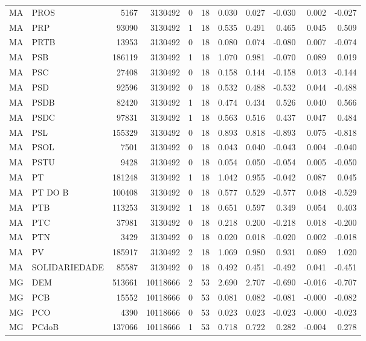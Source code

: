 \begin{landscape}
\begin{longtable}{llrrrrrrrrr}
MA & PROS & 5167 & 3130492 & 0 & 18 & 0.030 & 0.027 & -0.030 & 0.002 & -0.027 \\
MA & PRP & 93090 & 3130492 & 1 & 18 & 0.535 & 0.491 & 0.465 & 0.045 & 0.509 \\
MA & PRTB & 13953 & 3130492 & 0 & 18 & 0.080 & 0.074 & -0.080 & 0.007 & -0.074 \\
MA & PSB & 186119 & 3130492 & 1 & 18 & 1.070 & 0.981 & -0.070 & 0.089 & 0.019 \\
MA & PSC & 27408 & 3130492 & 0 & 18 & 0.158 & 0.144 & -0.158 & 0.013 & -0.144 \\
MA & PSD & 92596 & 3130492 & 0 & 18 & 0.532 & 0.488 & -0.532 & 0.044 & -0.488 \\
MA & PSDB & 82420 & 3130492 & 1 & 18 & 0.474 & 0.434 & 0.526 & 0.040 & 0.566 \\
MA & PSDC & 97831 & 3130492 & 1 & 18 & 0.563 & 0.516 & 0.437 & 0.047 & 0.484 \\
MA & PSL & 155329 & 3130492 & 0 & 18 & 0.893 & 0.818 & -0.893 & 0.075 & -0.818 \\
MA & PSOL & 7501 & 3130492 & 0 & 18 & 0.043 & 0.040 & -0.043 & 0.004 & -0.040 \\
MA & PSTU & 9428 & 3130492 & 0 & 18 & 0.054 & 0.050 & -0.054 & 0.005 & -0.050 \\
MA & PT & 181248 & 3130492 & 1 & 18 & 1.042 & 0.955 & -0.042 & 0.087 & 0.045 \\
MA & PT DO B & 100408 & 3130492 & 0 & 18 & 0.577 & 0.529 & -0.577 & 0.048 & -0.529 \\
MA & PTB & 113253 & 3130492 & 1 & 18 & 0.651 & 0.597 & 0.349 & 0.054 & 0.403 \\
MA & PTC & 37981 & 3130492 & 0 & 18 & 0.218 & 0.200 & -0.218 & 0.018 & -0.200 \\
MA & PTN & 3429 & 3130492 & 0 & 18 & 0.020 & 0.018 & -0.020 & 0.002 & -0.018 \\
MA & PV & 185917 & 3130492 & 2 & 18 & 1.069 & 0.980 & 0.931 & 0.089 & 1.020 \\
MA & SOLIDARIEDADE & 85587 & 3130492 & 0 & 18 & 0.492 & 0.451 & -0.492 & 0.041 & -0.451 \\
MG & DEM & 513661 & 10118666 & 2 & 53 & 2.690 & 2.707 & -0.690 & -0.016 & -0.707 \\
MG & PCB & 15552 & 10118666 & 0 & 53 & 0.081 & 0.082 & -0.081 & -0.000 & -0.082 \\
MG & PCO & 4390 & 10118666 & 0 & 53 & 0.023 & 0.023 & -0.023 & -0.000 & -0.023 \\
MG & PCdoB & 137066 & 10118666 & 1 & 53 & 0.718 & 0.722 & 0.282 & -0.004 & 0.278 \\

\end{longtable}
\end{landscape}
